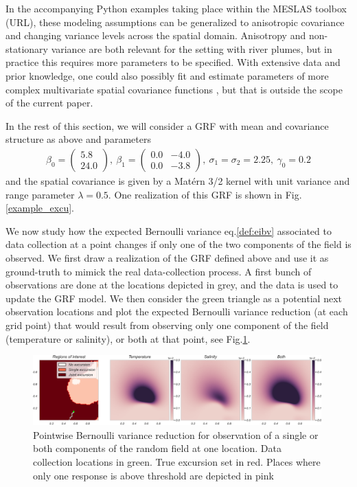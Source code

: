 \documentclass[aoas]{imsart}
\begin{document}
In the accompanying Python examples taking place within the MESLAS toolbox (URL), these modeling assumptions can be
generalized to anisotropic covariance and changing variance levels across the spatial domain. Anisotropy and
non-stationary variance are both relevant for the setting with river
plumes, but in practice this requires more parameters to be
specified. With extensive data and prior knowledge, one could also
possibly fit and estimate parameters of more complex multivariate
spatial covariance functions
\citep{gneiting2010matern,genton2015cross}, but that is outside the
scope of the current paper.

In the rest of this section, we will consider a GRF with mean and covariance structure as above and parameters
\begin{align*}
\beta_0 = \begin{pmatrix}
5.8\\ 24.0
\end{pmatrix}, ~ \beta_1 = \begin{pmatrix}
0.0 & -4.0\\
0.0 & -3.8
\end{pmatrix},~ \sigma_1 = \sigma_2 = 2.25, ~ \gamma_0 = 0.2
\end{align*}
and the spatial covariance is given by a Mat\'{e}rn 3/2 kernel with unit variance and range parameter $\lambda=0.5$.
One realization of this GRF is shown in Fig. \ref{example_excu}.

We now study how the expected Bernoulli variance eq.\eqref{def:eibv} associated to data collection at a point changes if only one of the two components of the field is observed. We first draw a realization of the GRF defined above and use it as ground-truth to mimick the real data-collection process. A first bunch of observations are done at the locations depicted in grey, and the data is used to update the GRF model. We then consider the green triangle as a potential next observation locations and plot the expected Bernoulli variance reduction (at each grid point) that would result from observing only one component of the field (temperature or salinity), or both at that point, see Fig.\ref{fig:ebv_comp}.

\begin{figure}[h!] \centering
  \includegraphics[width=0.99\textwidth]{Figures/ebv_comp_3.png}
  \caption{Pointwise Bernoulli variance reduction for observation of a single or both components of the random field at one location. Data collection locations in green. True excursion set in red. Places where only one response is above threshold are depicted in pink}
\label{fig:ebv_comp}
\end{figure}
\end{document}
